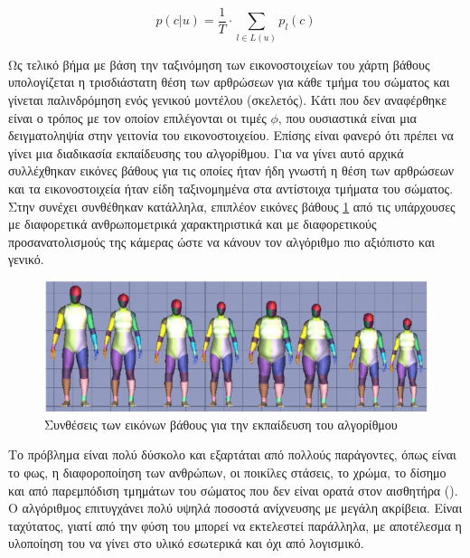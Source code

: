\begin{equation}
    p(c|u) = \frac{1}{T} \cdot \sum_{l \in L(u)} p_{l}(c)
    \label{equ:kinect-algorithm-pixel-probability}
\end{equation}

Ως τελικό βήμα με βάση την ταξινόμηση των εικονοστοιχείων του χάρτη βάθους υπολογίζεται η τρισδιάστατη θέση των αρθρώσεων για κάθε τμήμα του σώματος και γίνεται παλινδρόμηση ενός γενικού μοντέλου (σκελετός). Κάτι που δεν αναφέρθηκε είναι ο τρόπος με τον οποίον επιλέγονται οι τιμές $\phi$, που ουσιαστικά είναι μια δειγματοληψία στην γειτονία του εικονοστοιχείου. Επίσης είναι φανερό ότι πρέπει να γίνει μια διαδικασία εκπαίδευσης του αλγορίθμου. Για να γίνει αυτό αρχικά συλλέχθηκαν εικόνες βάθους για τις οποίες ήταν ήδη γνωστή η θέση των αρθρώσεων και τα εικονοστοιχεία ήταν είδη ταξινομημένα στα αντίστοιχα τμήματα του σώματος. Στην συνέχει συνθέθηκαν κατάλληλα, επιπλέον εικόνες βάθους \ref{fig:kinect-data-synthesis} από τις υπάρχουσες με διαφορετικά ανθρωπομετρικά χαρακτηριστικά και με διαφορετικούς προσανατολισμούς της κάμερας ώστε να κάνουν τον αλγόριθμο πιο αξιόπιστο και γενικό.

\begin{figure}[H]
    \centering
    \includegraphics[width=.9\textwidth]{fig/kinect-data-synthesis.png}
    \caption{Συνθέσεις των εικόνων βάθους για την εκπαίδευση του αλγορίθμου \cite{shotton11}}
    \label{fig:kinect-data-synthesis}
\end{figure}

Το πρόβλημα είναι πολύ δύσκολο και εξαρτάται από πολλούς παράγοντες, όπως είναι το φως, η διαφοροποίηση των ανθρώπων, οι ποικίλες στάσεις, το χρώμα, το δίσημο και από παρεμπόδιση τμημάτων του σώματος που δεν είναι ορατά στον αισθητήρα (). Ο αλγόριθμος επιτυγχάνει πολύ υψηλά ποσοστά ανίχνευσης με μεγάλη ακρίβεια. Είναι ταχύτατος, γιατί από την φύση του μπορεί να εκτελεστεί παράλληλα, με αποτέλεσμα η υλοποίηση του να γίνει στο υλικό εσωτερικά και όχι από λογισμικό.

